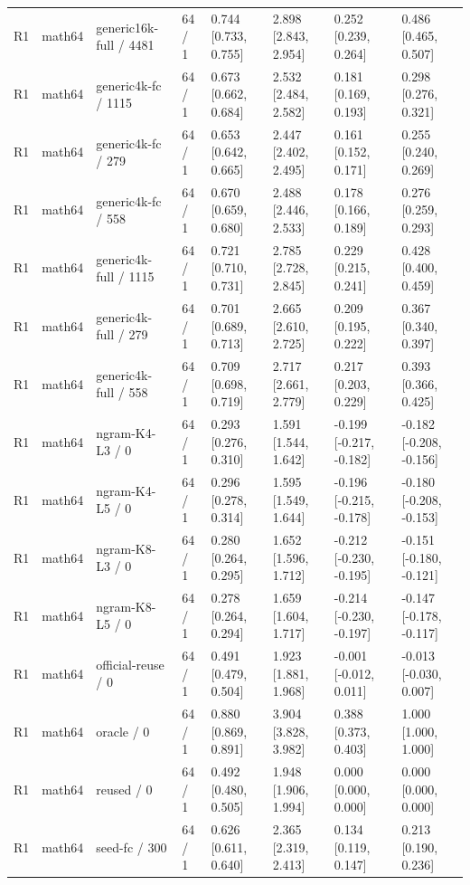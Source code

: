 \begin{tabular}{llllllll}
R1 & math64 & generic16k-full / 4481 & 64 / 1 & 0.744 [0.733, 0.755] & 2.898 [2.843, 2.954] & 0.252 [0.239, 0.264] & 0.486 [0.465, 0.507] \\
R1 & math64 & generic4k-fc / 1115 & 64 / 1 & 0.673 [0.662, 0.684] & 2.532 [2.484, 2.582] & 0.181 [0.169, 0.193] & 0.298 [0.276, 0.321] \\
R1 & math64 & generic4k-fc / 279 & 64 / 1 & 0.653 [0.642, 0.665] & 2.447 [2.402, 2.495] & 0.161 [0.152, 0.171] & 0.255 [0.240, 0.269] \\
R1 & math64 & generic4k-fc / 558 & 64 / 1 & 0.670 [0.659, 0.680] & 2.488 [2.446, 2.533] & 0.178 [0.166, 0.189] & 0.276 [0.259, 0.293] \\
R1 & math64 & generic4k-full / 1115 & 64 / 1 & 0.721 [0.710, 0.731] & 2.785 [2.728, 2.845] & 0.229 [0.215, 0.241] & 0.428 [0.400, 0.459] \\
R1 & math64 & generic4k-full / 279 & 64 / 1 & 0.701 [0.689, 0.713] & 2.665 [2.610, 2.725] & 0.209 [0.195, 0.222] & 0.367 [0.340, 0.397] \\
R1 & math64 & generic4k-full / 558 & 64 / 1 & 0.709 [0.698, 0.719] & 2.717 [2.661, 2.779] & 0.217 [0.203, 0.229] & 0.393 [0.366, 0.425] \\
R1 & math64 & ngram-K4-L3 / 0 & 64 / 1 & 0.293 [0.276, 0.310] & 1.591 [1.544, 1.642] & -0.199 [-0.217, -0.182] & -0.182 [-0.208, -0.156] \\
R1 & math64 & ngram-K4-L5 / 0 & 64 / 1 & 0.296 [0.278, 0.314] & 1.595 [1.549, 1.644] & -0.196 [-0.215, -0.178] & -0.180 [-0.208, -0.153] \\
R1 & math64 & ngram-K8-L3 / 0 & 64 / 1 & 0.280 [0.264, 0.295] & 1.652 [1.596, 1.712] & -0.212 [-0.230, -0.195] & -0.151 [-0.180, -0.121] \\
R1 & math64 & ngram-K8-L5 / 0 & 64 / 1 & 0.278 [0.264, 0.294] & 1.659 [1.604, 1.717] & -0.214 [-0.230, -0.197] & -0.147 [-0.178, -0.117] \\
R1 & math64 & official-reuse / 0 & 64 / 1 & 0.491 [0.479, 0.504] & 1.923 [1.881, 1.968] & -0.001 [-0.012, 0.011] & -0.013 [-0.030, 0.007] \\
R1 & math64 & oracle / 0 & 64 / 1 & 0.880 [0.869, 0.891] & 3.904 [3.828, 3.982] & 0.388 [0.373, 0.403] & 1.000 [1.000, 1.000] \\
R1 & math64 & reused / 0 & 64 / 1 & 0.492 [0.480, 0.505] & 1.948 [1.906, 1.994] & 0.000 [0.000, 0.000] & 0.000 [0.000, 0.000] \\
R1 & math64 & seed-fc / 300 & 64 / 1 & 0.626 [0.611, 0.640] & 2.365 [2.319, 2.413] & 0.134 [0.119, 0.147] & 0.213 [0.190, 0.236] \\

\end{tabular}
